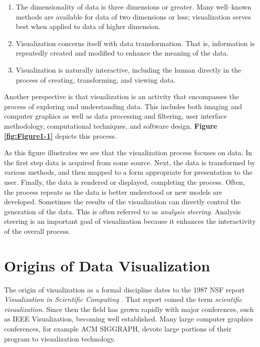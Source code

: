 \begin{enumerate}
  \item The dimensionality of data is three dimensions or greater. Many well--known methods are available for data of two dimensions or less; visualization serves best when applied to data of higher dimension.

  \item Visualization concerns itself with data transformation. That is, information is repeatedly created and modified to enhance the meaning of the data.

  \item Visualization is naturally interactive, including the human directly in the process of creating, transforming, and viewing data.
\end{enumerate}

Another perspective is that visualization is an activity that encompasses the process of exploring and understanding data. This includes both imaging and computer graphics as well as data processing and filtering, user interface methodology, computational techniques, and software design. \textbf{Figure \ref{fig:Figure1-1}} depicts this process.

As this figure illustrates we see that the visualization process focuses on data. In the first step data is acquired from some source. Next, the data is transformed by various methods, and then mapped to a form appropriate for presentation to the user. Finally, the data is rendered or displayed, completing the process. Often, the process repeats as the data is better understood or new models are developed. Sometimes the results of the visualization can directly control the generation of the data. This is often referred to as \emph{analysis steering}. Analysis steering is an important goal of visualization because it enhances the interactivity of the overall process.

\section{Origins of Data Visualization}

The origin of visualization as a formal discipline dates to the 1987 NSF report \emph{Visualization in Scientific Computing} \cite{McCormick87}. That report coined the term \emph{scientific visualization}. Since then the field has grown rapidly with major conferences, such as IEEE Visualization, becoming well established. Many large computer graphics conferences, for example ACM SIGGRAPH, devote large portions of their program to visualization technology.

